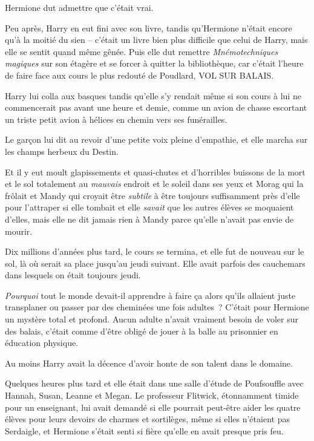 Hermione dut admettre que c'était vrai.

Peu après, Harry en eut fini avec son livre, tandis qu'Hermione n'était encore qu'à la moitié du sien -- c'était un livre bien plus difficile que celui de Harry, mais elle se sentit quand même gênée.
Puis elle dut remettre \emph{Mnémotechniques magiques} sur son étagère et se forcer à quitter la bibliothèque, car c'était l'heure de faire face aux cours le plus redouté de Poudlard, VOL SUR BALAIS.

Harry lui colla aux basques tandis qu'elle s'y rendait même si son cours à lui ne commencerait pas avant une heure et demie, comme un avion de chasse escortant un triste petit avion à hélices en chemin vers ses funérailles.

Le garçon lui dit au revoir d'une petite voix pleine d'empathie, et elle marcha sur les champs herbeux du Destin.

Et il y eut moult glapissements et quasi-chutes et d'horribles buissons de la mort et le sol totalement au \emph{mauvais} endroit et le soleil dans ses yeux et Morag qui la frôlait et Mandy qui croyait être \emph{subtile} à être toujours suffisamment près d'elle pour l'attraper si elle tombait et elle \emph{savait} que les autres élèves se moquaient d'elles, mais elle ne dit jamais rien à Mandy parce qu'elle n'avait pas envie de mourir.

Dix millions d'années plus tard, le cours se termina, et elle fut de nouveau sur le sol, là où serait sa place jusqu'au jeudi suivant.
Elle avait parfois des cauchemars dans lesquels on était toujours jeudi.

\emph{Pourquoi} tout le monde devait-il apprendre à faire ça alors qu'ils allaient juste transplaner ou passer par des cheminées une fois adultes~?
C'était pour Hermione un mystère total et profond.
Aucun adulte n'avait vraiment besoin de voler sur des balais, c'était comme d'être obligé de jouer à la balle au prisonnier en éducation physique.

Au moins Harry avait la décence d'avoir honte de son talent dans le domaine.

\later

Quelques heures plus tard et elle était dans une salle d'étude de Poufsouffle avec Hannah, Susan, Leanne et Megan.
Le professeur Flitwick, étonnamment timide pour un enseignant, lui avait demandé si elle pourrait peut-être aider les quatre élèves pour leurs devoirs de charmes et sortilèges, même si elles n'étaient pas Serdaigle, et Hermione s'était senti si fière qu'elle en avait presque pris feu.

